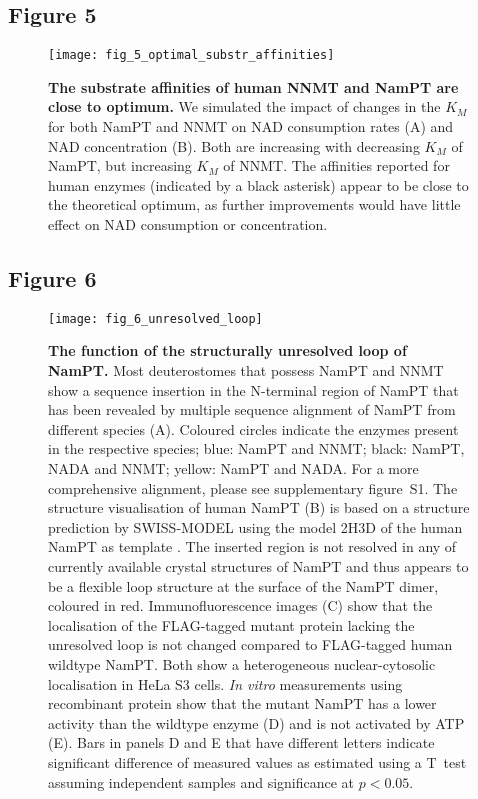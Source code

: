 \newpage


\subsection*{Figure 5}

\begin{figure}[ht]
  \centering
  \texttt{[image: fig\_5\_optimal\_substr\_affinities]}
  \caption{\textbf{The substrate affinities of human NNMT and NamPT are close to optimum.} We simulated the impact of changes in the $K_{M}$ for both NamPT and NNMT on NAD consumption rates (A) and NAD concentration (B). Both are increasing with decreasing $K_{M}$ of NamPT, but increasing $K_{M}$ of NNMT. The affinities reported for human enzymes (indicated by a black asterisk) appear to be close to the theoretical optimum, as further improvements would have little effect on NAD consumption or concentration.}
  \label{fig:optimal_substr_affinities}
\end{figure}

\newpage


\subsection*{Figure 6}

\begin{figure}[ht]
  \centering
  \texttt{[image: fig\_6\_unresolved\_loop]}
  \caption{\textbf{The function of the structurally unresolved loop of NamPT.} Most deuterostomes that possess NamPT and NNMT show a sequence insertion in the N-terminal region of NamPT that has been revealed by multiple sequence alignment of NamPT from different species (A). Coloured circles indicate the enzymes present in the respective species; blue: NamPT and NNMT; black: NamPT, NADA and NNMT; yellow: NamPT and NADA. For a more comprehensive alignment, please see supplementary figure~S1. The structure visualisation of human NamPT (B) is based on a structure prediction by SWISS-MODEL \cite{Arnold2006,Biasini2014} using the model 2H3D of the human NamPT as template \cite{Wang2006}. The inserted region is not resolved in any of currently available crystal structures of NamPT and thus appears to be a flexible loop structure at the surface of the NamPT dimer, coloured in red. Immunofluorescence images (C) show that the localisation of the FLAG-tagged mutant protein lacking the unresolved loop is not changed compared to FLAG-tagged human wildtype NamPT. Both show a heterogeneous nuclear-cytosolic localisation in HeLa S3 cells. \textit{In vitro} measurements using recombinant protein show that the mutant NamPT has a lower activity than the wildtype enzyme (D) and is not activated by ATP (E). Bars in panels D and E that have different letters indicate significant difference of measured values as estimated using a T~test assuming independent samples and significance at $p < 0.05$.}
  \label{fig:unresolved_loop}
\end{figure}

